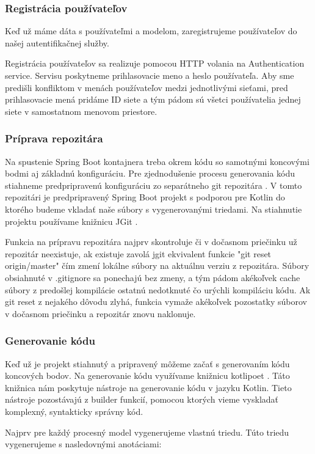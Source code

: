 \subsubsection{Registrácia používateľov}
Keď už máme dáta s používateľmi a modelom, zaregistrujeme používateľov do našej autentifikačnej služby.

Registrácia používateľov sa realizuje pomocou HTTP volania na Authentication service. Servisu poskytneme prihlasovacie meno a heslo používateľa. Aby sme predišli konfliktom v menách používateľov medzi jednotlivými sieťami, pred prihlasovacie mená pridáme ID siete a tým pádom sú všetci používatelia jednej siete v samostatnom menovom priestore.

\subsubsection{Príprava repozitára}
Na spustenie Spring Boot kontajnera treba okrem kódu so samotnými koncovými bodmi aj základnú konfiguráciu. Pre zjednodušenie procesu generovania kódu stiahneme predpripravenú konfiguráciu zo separátneho git repozitára \cite{dp_relay}. V tomto repozitári je predpripravený Spring Boot projekt s podporou pre Kotlin do ktorého budeme vkladať naše súbory s vygenerovanými triedami. Na stiahnutie projektu používame knižnicu JGit \cite{jgit}.

Funkcia na prípravu repozitára najprv skontroluje či v dočasnom priečinku už repozitár neexistuje, ak existuje zavolá jgit ekvivalent funkcie "git reset origin/master" čím zmení lokálne súbory na aktuálnu verziu z repozitára. Súbory obsiahnuté v .gitignore sa ponechajú bez zmeny, a tým pádom akékoľvek cache súbory z predošlej kompilácie ostatnú nedotknuté čo urýchli kompiláciu kódu. Ak git reset z nejakého dôvodu zlyhá, funkcia vymaže akékoľvek pozostatky súborov v dočasnom priečinku a repozitár znovu naklonuje.

\subsubsection{Generovanie kódu}
Keď už je projekt stiahnutý a pripravený môžeme začať s generovaním kódu koncových bodov. Na generovanie kódu  využívame knižnicu kotlipoet \cite{kotlipoet}. Táto knižnica nám poskytuje nástroje na generovanie kódu v jazyku Kotlin. Tieto nástroje pozostávajú z builder funkcií, pomocou ktorých vieme vyskladať komplexný, syntakticky správny kód.

Najprv pre každý procesný model vygenerujeme vlastnú triedu. Túto triedu vygenerujeme s nasledovnými anotáciami:

